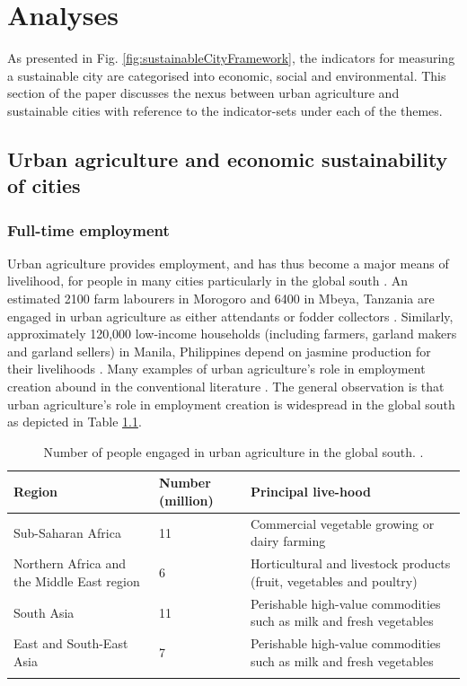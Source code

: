 \chapter{Analyses} %

\label{Chapter:Analyses}

As presented in Fig. \ref{fig:sustainableCityFramework}, the indicators for measuring a sustainable city are categorised into economic, social and environmental. This section of the paper discusses the nexus between urban agriculture and sustainable cities with reference to the indicator-sets under each of the themes.

\section{Urban agriculture and economic sustainability of cities}

\subsection{Full-time employment}

Urban agriculture provides employment, and has thus become a major means of livelihood, for people in many cities particularly in the global south \cite{Kodjo2014, Zezza2010}. An estimated 2100 farm labourers in Morogoro and 6400 in Mbeya, Tanzania are engaged in urban agriculture as either attendants or fodder collectors \cite{InternationalLabourOrganization2006}. Similarly, approximately 120,000 low-income households (including farmers, garland makers and garland sellers) in Manila, Philippines depend on jasmine production for their livelihoods \cite{IPC2007}. Many examples of urban agriculture's role in employment creation abound in the conventional literature \cite{Amponsah2016}. The general observation is that urban agriculture's role in employment creation is widespread in the global south as depicted in Table \ref{tbl:peopleEngagedInUA}.

\begin{table}[th]
\caption{Number of people engaged in urban agriculture in the global south. \cite{FAO2003}.}
\begin{center}
\begin{tabular}{ p{} p{} p{} } 
\hline
Region & Number (million) & Principal live-hood \\
\hline
Sub-Saharan Africa & 11 & Commercial vegetable growing or dairy farming \\
Northern Africa and the Middle East region & 6 & Horticultural and livestock products (fruit, vegetables and poultry) \\
South Asia & 11 & Perishable high-value commodities such as milk and fresh vegetables \\
East and South-East Asia & 7 & Perishable high-value commodities such as milk and fresh vegetables \\
\hline
\label{tbl:peopleEngagedInUA}
\end{tabular}
\end{center}
\end{table}

